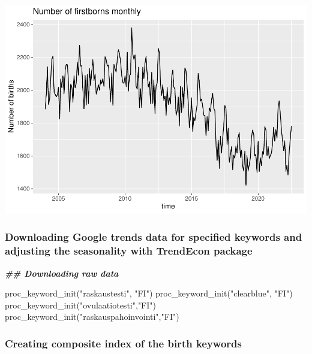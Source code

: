 \documentclass[
]{article}
\newenvironment{Shaded}{\begin{snugshade}}{\end{snugshade}}
\newcommand{\DocumentationTok}[1]{\textcolor[rgb]{0.56,0.35,0.01}{\textbf{\textit{#1}}}}
\newcommand{\FunctionTok}[1]{\textcolor[rgb]{0.00,0.00,0.00}{#1}}
\newcommand{\NormalTok}[1]{#1}
\newcommand{\StringTok}[1]{\textcolor[rgb]{0.31,0.60,0.02}{#1}}
\begin{document}
\includegraphics{GoogleTrendsMarkdown_files/figure-latex/unnamed-chunk-5-2.pdf}

\hypertarget{downloading-google-trends-data-for-specified-keywords-and-adjusting-the-seasonality-with-trendecon-package}{%
\subsubsection{Downloading Google trends data for specified keywords and
adjusting the seasonality with TrendEcon
package}\label{downloading-google-trends-data-for-specified-keywords-and-adjusting-the-seasonality-with-trendecon-package}}

\begin{Shaded}
\begin{Highlighting}[]
\DocumentationTok{\#\# Downloading raw data}

\FunctionTok{proc\_keyword\_init}\NormalTok{(}\StringTok{"raskaustesti"}\NormalTok{, }\StringTok{"FI"}\NormalTok{)}
\FunctionTok{proc\_keyword\_init}\NormalTok{(}\StringTok{"clearblue"}\NormalTok{, }\StringTok{"FI"}\NormalTok{)}
\FunctionTok{proc\_keyword\_init}\NormalTok{(}\StringTok{"ovulaatiotesti"}\NormalTok{,}\StringTok{"FI"}\NormalTok{)}
\FunctionTok{proc\_keyword\_init}\NormalTok{(}\StringTok{"raskauspahoinvointi"}\NormalTok{,}\StringTok{"FI"}\NormalTok{)}
\end{Highlighting}
\end{Shaded}

\hypertarget{creating-composite-index-of-the-birth-keywords}{%
\subsubsection{Creating composite index of the birth
keywords}\label{creating-composite-index-of-the-birth-keywords}}
\end{document}

